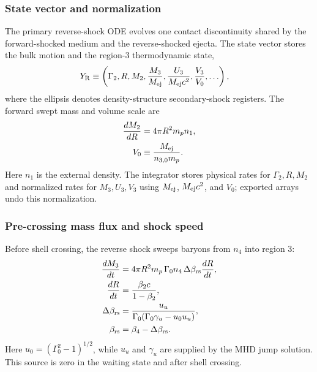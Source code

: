 \documentclass[twocolumn]{aastex702}
\begin{document}
\subsubsection{State vector and normalization}

The primary reverse-shock ODE evolves one contact discontinuity shared by the
forward-shocked medium and the reverse-shocked ejecta.  The state vector stores
the bulk motion and the region-3 thermodynamic state,
\begin{equation}
\begin{aligned}
Y_{\rm R}&\equiv
\left(\Gamma_2,R,M_2,\frac{M_3}{M_{\rm ej}},
\frac{U_3}{M_{\rm ej}c^2},\frac{V_3}{V_0},\ldots\right),
\end{aligned}
\end{equation}
where the ellipsis denotes density-structure secondary-shock registers.  The forward
swept mass and volume scale are
\begin{equation}
\begin{aligned}
\frac{dM_2}{dR}&=4\pi R^2m_pn_1,\\
V_0&\equiv \frac{M_{\rm ej}}{n_{3,0}m_p}.
\end{aligned}
\end{equation}
Here \(n_1\) is the external density.  The integrator stores physical rates for
\(\Gamma_2,R,M_2\) and normalized rates for \(M_3,U_3,V_3\) using
\(M_{\rm ej}\), \(M_{\rm ej}c^2\), and \(V_0\); exported arrays undo this
normalization.

\subsubsection{Pre-crossing mass flux and shock speed}

Before shell crossing, the reverse shock sweeps baryons from \(n_4\) into region
3:
\begin{equation}
\begin{aligned}
\frac{dM_3}{dt}&=
4\pi R^2m_p\,\Gamma_0 n_4\,\Delta\beta_{\rm rs}
\frac{dR}{dt},\\
\frac{dR}{dt}&=\frac{\beta_2c}{1-\beta_2},\\
\Delta\beta_{\rm rs}
&=\frac{u_u}{\Gamma_0(\Gamma_0\gamma_u-u_0u_u)},\\
\beta_{\rm rs}&=\beta_4-\Delta\beta_{\rm rs}.
\end{aligned}
\end{equation}
Here \(u_0=(\Gamma_0^2-1)^{1/2}\), while \(u_u\) and \(\gamma_u\) are supplied by
the MHD jump solution.  This source is zero in the waiting state and after shell
crossing.
\end{document}
